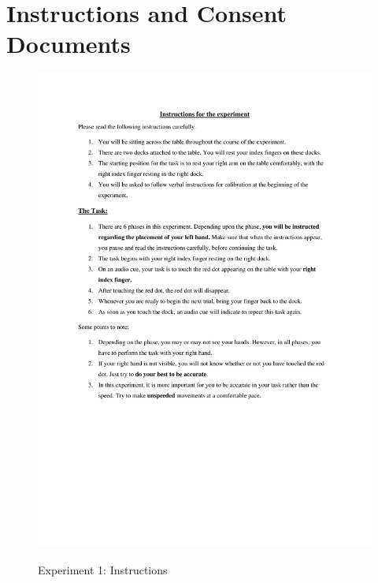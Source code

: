 \chapter{Instructions and Consent Documents} 
\label{App-vr-disclaimer} 

\begin{figure}[h!]
\centering  
    \caption{Experiment 1: Instructions}
    \includegraphics[width=\textwidth, keepaspectratio]{Images/admin/exp1-instructions.png}
    \label{}
\end{figure}

